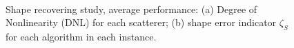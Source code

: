 \documentclass{IEEEtran}
\begin{document}
                \begin{figure}[!htb]
                    \centering
                     \\
                    \caption{Shape recovering study, average performance: (a) Degree of Nonlinearity (DNL) for each scatterer; (b) shape error indicator $\zeta_S$ for each algorithm in each instance.}
                    \label{fig:shape:average}   
                \end{figure}

\end{document}
